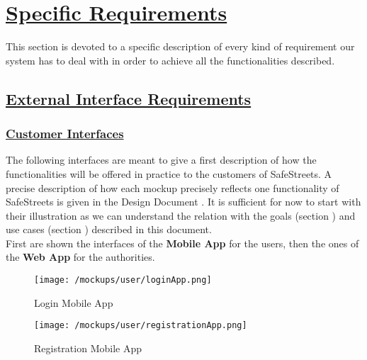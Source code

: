 \section[Specific Requirements]{\hyperlink{toc}{Specific Requirements}}
	\label{sec:specificRequirements}
	This section is devoted to a specific description of every kind of requirement our system has to deal with in order to achieve all the functionalities described.

\subsection[External Interface Requirements]{\hyperlink{toc}{External Interface Requirements}}
	\label{sec:externalInterfaceRequirements}
	
	\subsubsection[Customer Interfaces]{\hyperlink{toc}{Customer Interfaces}}
	\label{sec:customerInterfaces}
	
	The following interfaces are meant to give a first description of how the functionalities will be offered in practice to the customers of SafeStreets. A precise description of how each mockup precisely reflects one functionality of SafeStreets is given in the Design Document \cite{DD}. It is sufficient for now to start with their illustration as we can understand the relation with the goals (section ) and use cases (section ) described in this document.\\
	
	First are shown the interfaces of the \textbf{Mobile App} for the users, then the ones of the \textbf{Web App} for the authorities.
	
	\vspace{1cm}
	 
	\begin{figure}[h!]
		\centering
		\begin{minipage}{0.5\textwidth}
			\centering
			\texttt{[image: /mockups/user/loginApp.png]}
			\caption{Login Mobile App}
		\end{minipage}\hfill
		\begin{minipage}{0.5\textwidth}
			\centering
			\texttt{[image: /mockups/user/registrationApp.png]}
			\caption{Registration Mobile App}
		\end{minipage}
	\end{figure}

